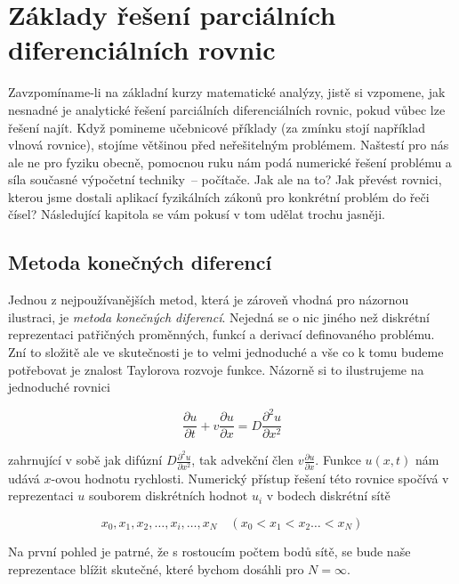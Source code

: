 \chapter{Základy řešení parciálních diferenciálních rovnic}

Zavzpomíname-li na základní kurzy matematické analýzy, jistě si vzpomene, jak 
nesnadné je analytické řešení parciálních diferenciálních rovnic, pokud vůbec lze 
řešení najít. Když pomineme učebnicové příklady (za zmínku stojí například vlnová 
rovnice), stojíme většinou před neřešitelným problémem. Naštestí pro nás ale ne pro 
fyziku obecně, pomocnou ruku nám podá numerické řešení problému a síla současné 
výpočetní techniky~-- počítače. Jak ale na to? Jak převést rovnici, kterou jsme 
dostali aplikací fyzikálních zákonů pro konkrétní problém do řeči čísel? 
Následující kapitola se vám pokusí v tom udělat trochu jasněji.

\section{Metoda konečných diferencí}

Jednou z nejpoužívanějších metod, která je zároveň vhodná pro názornou ilustraci, 
je {\it metoda konečných diferencí}. Nejedná se o nic jiného než diskrétní 
reprezentaci patřičných proměnných, funkcí a derivací definovaného problému. Zní to 
složitě ale ve skutečnosti je to velmi jednoduché a vše co k tomu budeme potřebovat 
je znalost Taylorova rozvoje funkce. Názorně si to ilustrujeme na jednoduché 
rovnici

\begin{equation}
\frac{\partial u}
	 {\partial t} + v \frac{\partial u}
	                       {\partial x} = D \frac{\partial^2 u}
	                                             {\partial 	x^2}
\label{rovnice}
\end{equation}

zahrnující v sobě jak difúzní $D\frac{\partial^2 u}
                                      {\partial x^2}$,
tak advekční člen $v\frac{\partial u}
                          {\partial x}$.                          
Funkce $u(x, t)$ nám udává $x$-ovou hodnotu rychlosti. Numerický přístup řešení 
této rovnice spočívá v reprezentaci $u$ souborem diskrétních hodnot $u_{i}$ v 
bodech diskrétní sítě

$$
x_0, x_1, x_2, \dots, x_i, \dots, x_N \quad (x_0 < x_1 < x_2 \dots < x_N)
$$

Na první pohled je patrné, že s rostoucím počtem bodů sítě, se bude naše 
reprezentace blížit skutečné, které bychom dosáhli pro $N = \infty$.

